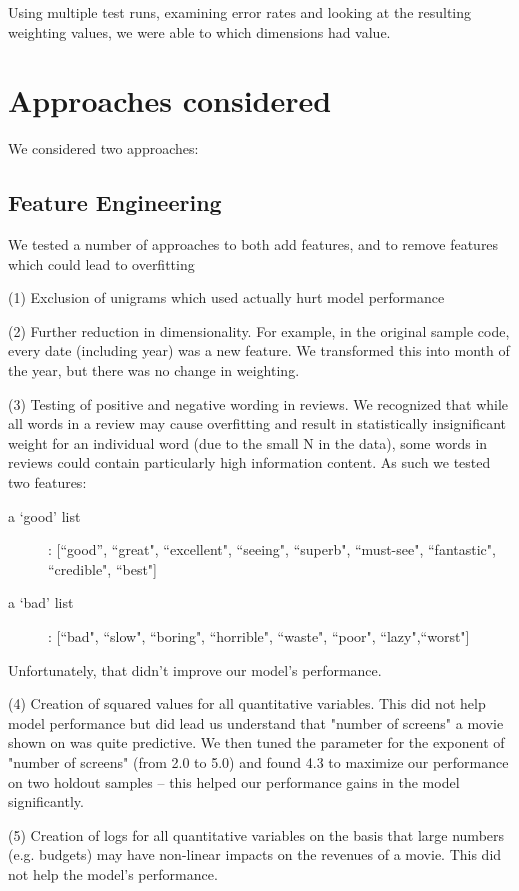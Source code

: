 \documentclass[11pt, oneside]{article}   	%
\begin{document}
Using multiple test runs, examining error rates and looking at the resulting weighting values, we were able to which dimensions had value.



\section*{Approaches considered}
We considered two approaches: 


\subsection*{Feature Engineering}
We tested a number of approaches to both add features, and to remove features which could lead to overfitting

(1) Exclusion of unigrams which used actually hurt model performance

(2) Further reduction in dimensionality. For example, in the original sample code, every date (including year) was a new feature. We transformed this into month of the year, but there was no change in weighting.

(3) Testing of positive and negative wording in reviews. We recognized that while all words in a review may cause overfitting and result in statistically insignificant weight for an individual word (due to the small N in the data), some words in reviews could contain particularly high information content. As such we tested two features:
\begin{description}
  \item[a `good' list]: [``good'', ``great", ``excellent", ``seeing", ``superb", ``must-see", ``fantastic", ``credible", ``best"]
  \item[a `bad' list]: [``bad", ``slow", ``boring", ``horrible", ``waste", ``poor", ``lazy",``worst"]
\end{description}
Unfortunately, that didn't improve our model's performance.

(4) Creation of squared values for all quantitative variables. This did not help model performance but did lead us understand that "number of screens" a movie shown on was quite predictive. We then tuned the parameter for the exponent of "number of screens" (from 2.0 to 5.0) and found 4.3 to maximize our performance on two holdout samples -- this helped our performance gains in the model significantly.

(5) Creation of logs for all quantitative variables on the basis that large numbers (e.g. budgets) may have non-linear impacts on the revenues of a movie. This did not help the model's performance.
\end{document}
